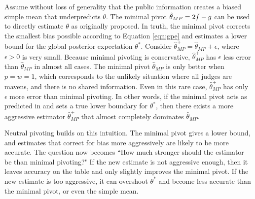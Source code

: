 Assume without loss of generality that the public information creates a biased simple mean that underpredicts $\theta$. The minimal pivot $\hat{\theta}_{MP} = 2\Bar{f}  - \Bar{g}$ can be used to directly estimate $\theta$ as originally proposed. In truth, the minimal pivot corrects the smallest bias possible according to Equation \ref{eqn:gpe} and estimates a lower bound for the global posterior expectation $\theta^*$. Consider $\hat{\theta}_{MP}^+ = \hat{\theta}_{MP} + \epsilon$, where $\epsilon>0$ is very small. Because minimal pivoting is conservative, $\hat{\theta}_{MP}^+ $ has $\epsilon$ less error than $\hat{\theta}_{MP}$ in almost all cases. The minimal pivot $\hat{\theta}_{MP}$ is only better when $p=w=1$, which corresponds to the unlikely situation where all judges are mavens, and there is no shared information. Even in this rare case,  $\hat{\theta}_{MP}^+$ has only $\epsilon$ more error than minimal pivoting. In other words, if the minimal pivot acts as predicted in \cite{mp} and sets a true lower boundary for $\theta^*$, then there exists a more aggressive estimator $\hat{\theta}_{MP}^+$ that almost completely dominates $\hat{\theta}_{MP}$.

Neutral pivoting builds on this intuition. The minimal pivot gives a lower bound, and estimates that correct for bias more aggressively are likely to be more accurate. The question now becomes ``How much stronger should the estimator be than minimal pivoting?" If the new estimate is not aggressive enough, then it leaves accuracy on the table and only slightly improves the minimal pivot. If the new estimate is too aggressive, it can overshoot $\theta^*$ and become less accurate than the minimal pivot, or even the simple mean. 


